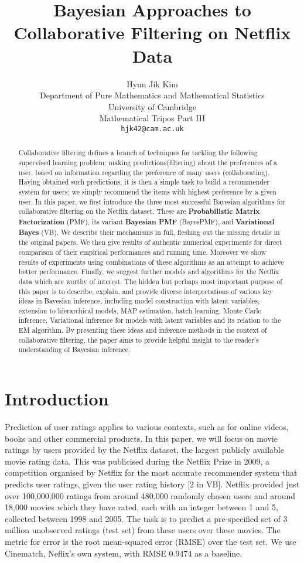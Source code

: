 \documentclass{article}
\title{Bayesian Approaches to Collaborative Filtering on Netflix Data}
\author{
Hyun Jik Kim \\
Department of Pure Mathematics and Mathematical Statistics\\
University of Cambridge\\
Mathematical Tripos Part III \\
\texttt{hjk42@cam.ac.uk} \\
}
\theoremstyle{plain}
\begin{document}
\maketitle

\begin{abstract}
Collaborative filtering defines a branch of techniques for tackling the following supervised learning problem: making predictions(filtering) about the preferences of a user, based on information regarding the preference of many users (collaborating).
Having obtained such predictions, it is then a simple task to build a recommender system for users; we simply recommend the items with highest preference by a given user.
In this paper, we first introduce the three most successful Bayesian algorithms for collaborative filtering on the Netflix dataset. These are \textbf{Probabilistic Matrix Factorization} (PMF), its variant \textbf{Bayesian PMF} (BayesPMF), and \textbf{Variational Bayes} (VB). We describe their mechanisms in full, fleshing out the missing details in the original papers. We then give results of authentic numerical experiments for direct comparison of their empirical performances and running time. Moreover we show results of experiments using combinations of these algorithms as an attempt to achieve better performance. Finally, we suggest further models and algorithms for the Netflix data which are worthy of interest. The hidden but perhaps most important purpose of this paper is to describe, explain, and provide diverse interpretations of various key ideas in Bayesian inference, including model construction with latent variables, extension to hierarchical models, MAP estimation, batch learning, Monte Carlo inference, Variational inference for models with latent variables and its relation to the EM algorithm. By presenting these ideas and inference methods in the context of collaborative filtering, the paper aims to provide helpful insight to the reader's understanding of Bayesian inference.
\end{abstract}

\section{Introduction}

Prediction of user ratings applies to various contexts, such as for online videos, books and other commercial products. In this paper, we will focus on movie ratings by users provided by the Netflix dataset, the largest publicly available movie rating data. This was publicised during the Netflix Prize in 2009, a competition organised by Netflix for the most accurate recommender system that predicts user ratings, given the user rating history [2 in VB]. Netflix provided just over 100,000,000 ratings from around 480,000 randomly chosen users and around 18,000 movies which they have rated, each with an integer between 1 and 5, collected between 1998 and 2005. The task is to predict a pre-specified set of 3 million unobserved ratings (test set) from these users over these movies. The metric for error is the root mean-squared error (RMSE) over the test set. We use Cinematch, Neflix's own system, with RMSE 0.9474 as a baseline.
\end{document}
